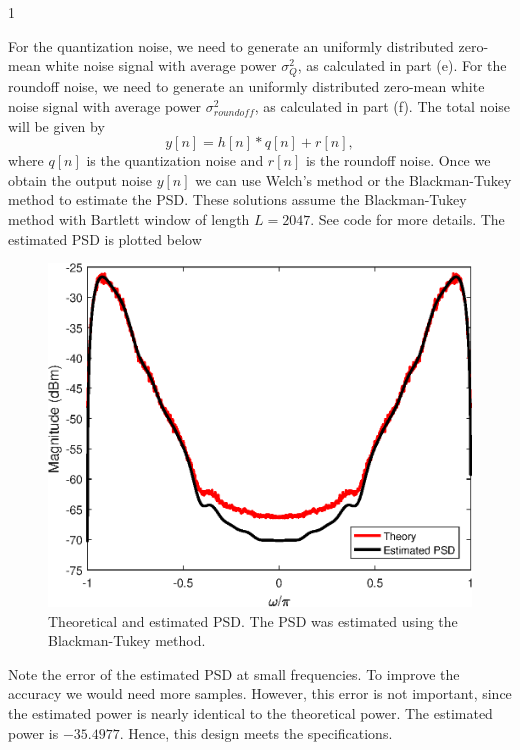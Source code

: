 \documentclass[10pt]{article}
\def\SOLUTIONS{0} %
\def\SolutionsColor{red2}
\begin{document}
\begin{enumerate}[label=(\alph*)]
	\if\SOLUTIONS1 {\color{\SolutionsColor}
		For the quantization noise, we need to generate an uniformly distributed zero-mean white noise signal with average power $\sigma_Q^2$, as calculated in part (e). For the roundoff noise, we need to generate an uniformly distributed zero-mean white noise signal with average power $\sigma_{roundoff}^2$, as calculated in part (f). The total noise will be given by
		\begin{equation}
		y[n] = h[n]\ast q[n] + r[n],
		\end{equation}
		where $q[n]$ is the quantization noise and $r[n]$ is the roundoff noise. Once we obtain the output noise $y[n]$ we can use Welch's method or the Blackman-Tukey method to estimate the PSD. These solutions assume the Blackman-Tukey method with Bartlett window of length $L = 2047$. See code for more details. The estimated PSD is plotted below
		
		\FloatBarrier
		\begin{figure}[h!]
			\centering
			\includegraphics[scale=0.6]{figs/hearing_aid_psd.eps}
			\caption{Theoretical and estimated PSD. The PSD was estimated using the Blackman-Tukey method.}
		\end{figure}
		\FloatBarrier
		
		Note the error of the estimated PSD at small frequencies. To improve the accuracy we would need more samples. However, this error is not important, since the estimated power is nearly identical to the theoretical power. The estimated power is $-35.4977$. Hence, this design meets the specifications.
	}\fi
	
\end{enumerate}
\end{document}
